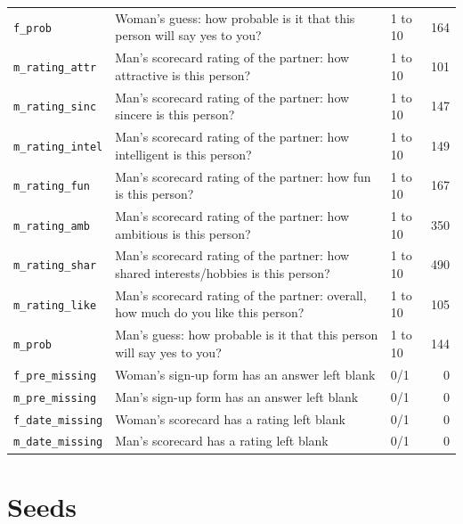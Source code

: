 \documentclass[11pt]{article}
\begin{document}
\begin{longtable}{L{3.3cm}L{8.2cm}L{2.4cm}r}
\texttt{f\_prob} & Woman's guess: how probable is it that this person will say yes to you? & 1 to 10 & 164 \\
\texttt{m\_rating\_attr} & Man's scorecard rating of the partner: how attractive is this person? & 1 to 10 & 101 \\
\texttt{m\_rating\_sinc} & Man's scorecard rating of the partner: how sincere is this person? & 1 to 10 & 147 \\
\texttt{m\_rating\_intel} & Man's scorecard rating of the partner: how intelligent is this person? & 1 to 10 & 149 \\
\texttt{m\_rating\_fun} & Man's scorecard rating of the partner: how fun is this person? & 1 to 10 & 167 \\
\texttt{m\_rating\_amb} & Man's scorecard rating of the partner: how ambitious is this person? & 1 to 10 & 350 \\
\texttt{m\_rating\_shar} & Man's scorecard rating of the partner: how shared interests/hobbies is this person? & 1 to 10 & 490 \\
\texttt{m\_rating\_like} & Man's scorecard rating of the partner: overall, how much do you like this person? & 1 to 10 & 105 \\
\texttt{m\_prob} & Man's guess: how probable is it that this person will say yes to you? & 1 to 10 & 144 \\
\texttt{f\_pre\_missing} & Woman's sign-up form has an answer left blank & 0/1 & 0 \\
\texttt{m\_pre\_missing} & Man's sign-up form has an answer left blank & 0/1 & 0 \\
\texttt{f\_date\_missing} & Woman's scorecard has a rating left blank & 0/1 & 0 \\
\texttt{m\_date\_missing} & Man's scorecard has a rating left blank & 0/1 & 0 \\
\bottomrule
\end{longtable}
\normalsize

\section{Seeds}
\end{document}

